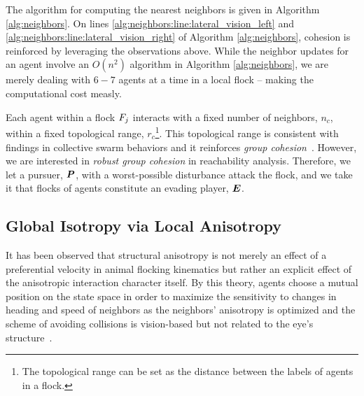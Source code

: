 %
The algorithm for computing the nearest neighbors is given in Algorithm \autoref{alg:neighbors}. On lines \autoref{alg:neighbors:line:lateral_vision_left} and \autoref{alg:neighbors:line:lateral_vision_right} of Algorithm \autoref{alg:neighbors}, cohesion is reinforced by leveraging the observations above. While the neighbor updates for an agent involve an $O(n^2)$ algorithm in Algorithm \ref{alg:neighbors}, we are merely dealing with $6-7$ agents at a time in a local flock -- making the computational cost measly.

Each agent within a flock $F_j$ interacts with a fixed number of neighbors, $n_c$, within a fixed topological range, $r_c$\footnote{The topological range can be set as the distance between the labels of agents in a flock.}. This topological range %
is consistent with findings in collective swarm behaviors and it reinforces \textit{group cohesion}~\cite{Ballerini1232}. However, we are interested in \textit{robust group cohesion} in reachability analysis. Therefore, we let a pursuer, $\bm{P}$, with a worst-possible disturbance attack the flock, and we take it that flocks of agents constitute an evading player, $\bm{E}$. 

\subsection{Global Isotropy via Local Anisotropy}
%
It has been observed that structural anisotropy is not merely an effect of a preferential velocity in animal flocking kinematics but rather an explicit effect of the anisotropic interaction character itself. By this theory, agents choose a mutual position on the state space in order to maximize the sensitivity to changes in heading and speed of neighbors as the neighbors' anisotropy is optimized and the scheme of avoiding collisions  is vision-based but not related to the eye's structure~\cite{Ballerini1232}.
 
